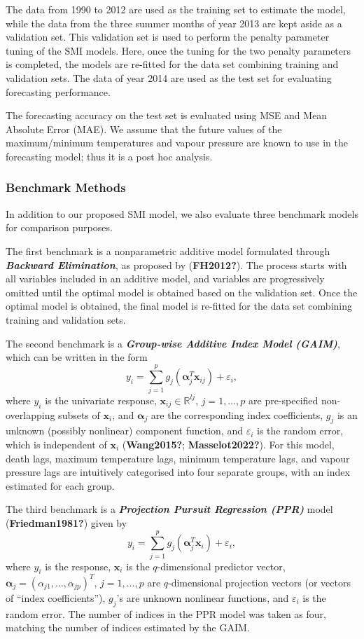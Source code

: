 \documentclass[
  11pt,
  a4paper,
]{report}
\begin{document}
The data from 1990 to 2012 are used as the training set to estimate the
model, while the data from the three summer months of year 2013 are kept
aside as a validation set. This validation set is used to perform the
penalty parameter tuning of the SMI models. Here, once the tuning for
the two penalty parameters is completed, the models are re-fitted for
the data set combining training and validation sets. The data of year
2014 are used as the test set for evaluating forecasting performance.

The forecasting accuracy on the test set is evaluated using MSE and Mean
Absolute Error (MAE). We assume that the future values of the
maximum/minimum temperatures and vapour pressure are known to use in the
forecasting model; thus it is a post hoc analysis.

\subsubsection{Benchmark Methods}\label{sec-benchmark}

In addition to our proposed SMI model, we also evaluate three benchmark
models for comparison purposes.

The first benchmark is a nonparametric additive model formulated through
\textbf{\emph{Backward Elimination}}, as proposed by (\textbf{FH2012?}).
The process starts with all variables included in an additive model, and
variables are progressively omitted until the optimal model is obtained
based on the validation set. Once the optimal model is obtained, the
final model is re-fitted for the data set combining training and
validation sets.

The second benchmark is a \textbf{\emph{Group-wise Additive Index Model
(GAIM)}}, which can be written in the form \[
  y_{i} = \sum_{j = 1}^{p} g_{j}(\bm{\alpha}_{j}^{T}\bm{x}_{ij}) + \varepsilon_{i},
\] where \(y_{i}\) is the univariate response,
\(\bm{x}_{ij} \in \mathbb{R}^{l{j}}\), \(j = 1, \dots, p\) are
pre-specified non-overlapping subsets of \(\bm{x}_{i}\), and
\(\bm{\alpha}_j\) are the corresponding index coefficients, \(g_{j}\) is
an unknown (possibly nonlinear) component function, and
\(\varepsilon_{i}\) is the random error, which is independent of
\(\bm{x}_{i}\) (\textbf{Wang2015?}; \textbf{Masselot2022?}). For this
model, death lags, maximum temperature lags, minimum temperature lags,
and vapour pressure lags are intuitively categorised into four separate
groups, with an index estimated for each group.

The third benchmark is a \textbf{\emph{Projection Pursuit Regression
(PPR)}} model (\textbf{Friedman1981?}) given by \[
  y_{i} = \sum_{j=1}^{p} {g_{j}(\bm{\alpha}_{j}^{T}\bm{x}_{i})} + \varepsilon_{i},
\] where \(y_{i}\) is the response, \(\bm{x}_{i}\) is the
\(q\)-dimensional predictor vector,
\(\bm{\alpha}_{j} = ( \alpha_{j1}, \dots, \alpha_{jp} )^{T}\),
\(j = 1, \dots, p\) are \(q\)-dimensional projection vectors (or vectors
of ``index coefficients''), \(g_{j}\)'s are unknown nonlinear functions,
and \(\varepsilon_{i}\) is the random error. The number of indices in
the PPR model was taken as four, matching the number of indices
estimated by the GAIM.
\end{document}
